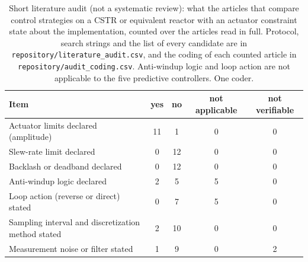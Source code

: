 \begin{table}[t]
\centering
\footnotesize
\setlength{\tabcolsep}{3pt}
\caption{Short literature audit (not a systematic review): what the articles that compare control strategies on a CSTR or equivalent reactor with an actuator constraint state about the implementation, counted over the articles read in full. Protocol, search strings and the list of every candidate are in \texttt{repository/literature\_audit.csv}, and the coding of each counted article in \texttt{repository/audit\_coding.csv}. Anti-windup logic and loop action are not applicable to the five predictive controllers. One coder.}
\label{tab:literature_audit}
\begin{tabular}{lcccc}
\toprule
Item & yes & no & not applicable & not verifiable \\
\midrule
Actuator limits declared (amplitude) & 11 & 1 & 0 & 0 \\
Slew-rate limit declared & 0 & 12 & 0 & 0 \\
Backlash or deadband declared & 0 & 12 & 0 & 0 \\
Anti-windup logic declared & 2 & 5 & 5 & 0 \\
Loop action (reverse or direct) stated & 0 & 7 & 5 & 0 \\
Sampling interval and discretization method stated & 2 & 10 & 0 & 0 \\
Measurement noise or filter stated & 1 & 9 & 0 & 2 \\
\bottomrule
\end{tabular}
\end{table}
